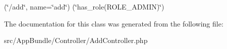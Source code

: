 (\char`\"{}/add\char`\"{}, name=\char`\"{}add\char`\"{}) (\char`\"{}has\+\_\+role(\textquotesingle{}\+R\+O\+L\+E\+\_\+\+A\+D\+M\+I\+N\textquotesingle{})\char`\"{}) 

The documentation for this class was generated from the following file\+:\begin{DoxyCompactItemize}
\item 
src/\+App\+Bundle/\+Controller/Add\+Controller.\+php\end{DoxyCompactItemize}

